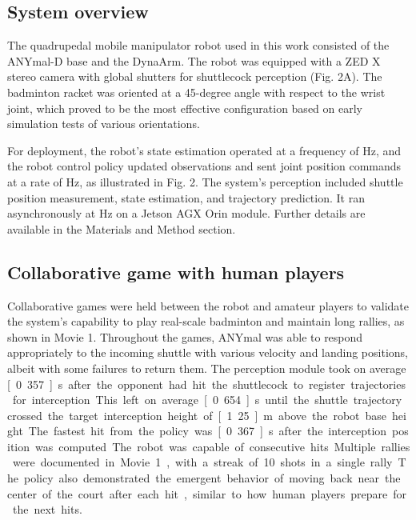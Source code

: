 \documentclass[9pt,twocolumn,twoside]{osajnl}
\begin{document}
\subsection*{System overview}



The quadrupedal mobile manipulator robot used in this work consisted of the ANYmal-D base \cite{hutter2016anymal} and the DynaArm. The robot was equipped with a ZED X stereo camera with global shutters for shuttlecock perception (Fig. 2A). The badminton racket was oriented at a 45-degree angle with respect to the wrist joint, which proved to be the most effective configuration based on early simulation tests of various orientations.

For deployment, the robot's state estimation operated at a frequency of \unit[400]{Hz}, and the robot control policy updated observations and sent joint position commands at a rate of \unit[100]{Hz}, as illustrated in Fig. 2. The system's perception included shuttle position measurement, state estimation, and trajectory prediction. It ran asynchronously at \unit[60]{Hz} on a Jetson AGX Orin module. Further details are available in the Materials and Method section.

\subsection*{Collaborative game with human players}
Collaborative games were held between the robot and amateur players to validate the system's capability to play real-scale badminton and maintain long rallies, as shown in Movie 1. Throughout the games, ANYmal was able to respond appropriately to the incoming shuttle with various velocity and landing positions, albeit with some failures to return them. The perception module took on average \unit[0.357]{s} after the opponent had hit the shuttlecock to register trajectories for interception. This left on average \unit[0.654]{s} until the shuttle trajectory crossed the target interception height of \unit[1.25]{m} above the robot base height. The fastest hit from the policy was \unit[0.367]{s} after the interception position was computed.

The robot was capable of consecutive hits. Multiple rallies were documented in Movie 1, with a streak of 10 shots in a single rally. The policy also demonstrated the emergent behavior of moving back near the center of the court after each hit, similar to how human players prepare for the next hits.
\end{document}
